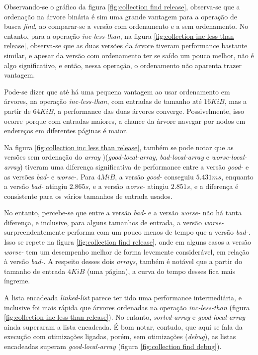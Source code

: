 \documentclass[a4paper]{article}
\begin{document}
Observando-se o gráfico da figura \ref{fig:collection find release},
observa-se que a ordenação na árvore binária é sim uma grande vantagem para
a operação de busca \textit{find}, ao comparar-se a versão com ordenamento e a
sem ordenamento. No entanto, para a operação \textit{inc-less-than}, na figura
\ref{fig:collection inc less than release}, observa-se que as duas versões da
árvore tiveram performance bastante similar, e apesar da versão com ordenamento
ter se saído um pouco melhor, não é algo significativo, e então, nessa operação,
o ordenamento não aparenta trazer vantagem.

Pode-se dizer que até há uma pequena vantagem ao usar ordenamento em árvores,
na operação \textit{inc-less-than}, com entradas de tamanho até
$16 KiB$, mas a partir de $64 KiB$, a performance das duas árvores converge.
Possivelmente, isso ocorre porque com entradas maiores, a chance da árvore
navegar por nodos em endereços em diferentes páginas é maior.

Na figura \ref{fig:collection inc less than release}, também se pode notar que
as versões sem ordenação do \textit{array} )(\textit{good-local-array},
\textit{bad-local-array} e \textit{worse-local-array}) tiveram uma diferença
significativa de performance entre a versão \textit{good-} e as versões
\textit{bad-} e \textit{worse-}. Para $4MiB$, a versão \textit{good-} conseguiu
$5.431 ms$, enquanto a versão \textit{bad-} atingiu $2.865 s$, e a versão
\textit{worse-} atingiu $2.851 s$, e a diferença é consistente para os vários
tamanhos de entrada usados.

No entanto, percebe-se que entre a versão \textit{bad-} e a versão
\textit{worse-} não há tanta diferença, e inclusive, para alguns tamanhos de
entrada, a versão \textit{worse-} surpreendentemente performa com um pouco menos
de tempo que a versão \textit{bad-}. Isso se repete na figura
\ref{fig:collection find release}, onde em alguns casos a versão
\textit{worse-} tem um desempenho melhor de forma levemente considerável,
em relação à versão \textit{bad-}. A respeito desses dois \textit{arrays},
também é notável que a partir do tamanho de entrada $4KiB$ (uma página),
a curva do tempo desses fica mais íngreme.

A lista encadeada \textit{linked-list} parece ter tido uma performance
intermediária, e inclusive foi mais rápida que árvores ordenadas na operação
\textit{inc-less-than} (figura \ref{fig:collection inc less than release}). No
entanto, \textit{sorted-array} e \textit{good-local-array} ainda superaram a
lista encadeada. É bom notar, contudo, que aqui se fala da execução com
otimizações ligadas, porém, sem otimizações (\textit{debug}), as listas
encadeadas superam \textit{good-local-array}
(figura \ref{fig:collection find debug}).
\end{document}
